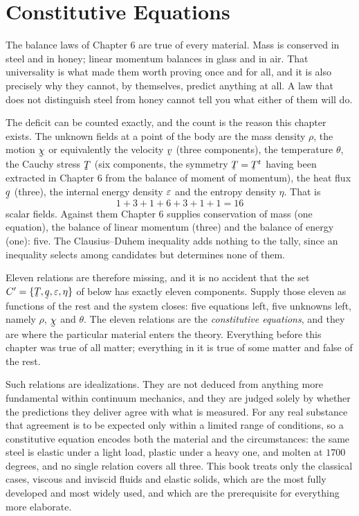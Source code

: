 \chapter{Constitutive Equations}

The balance laws of Chapter 6 are true of every material. Mass is
conserved in steel and in honey; linear momentum balances in glass and
in air. That universality is what made them worth proving once and for
all, and it is also precisely why they cannot, by themselves, predict
anything at all. A law that does not distinguish steel from honey
cannot tell you what either of them will do.

The deficit can be counted exactly, and the count is the reason this
chapter exists. The unknown fields at a point of the body are the mass
density $\rho$, the motion $\bchi$ or equivalently the velocity $\bv$
(three components), the temperature $\theta$, the Cauchy stress $\bT$
(six components, the symmetry $\bT=\bT^{t}$ having been extracted in
Chapter 6 from the balance of moment of momentum), the heat flux $\bq$
(three), the internal energy density $\varepsilon$ and the entropy density
$\eta$. That is
\[
   1+3+1+6+3+1+1=16
\]
scalar fields. Against them Chapter 6 supplies conservation of mass
(one equation), the balance of linear momentum (three) and the balance
of energy (one): five. The Clausius--Duhem inequality  adds
nothing to the tally, since an inequality selects among candidates but
determines none of them.

Eleven relations are therefore missing, and it is no accident that the
set $C'=\{\bT,\bq,\eps,\eta\}$ of  below has exactly eleven
components. Supply those eleven as functions of the rest and the system
closes: five equations left, five unknowns left, namely $\rho$, $\bchi$
and $\theta$. The eleven relations are the \emph{constitutive
equations}, and they are where the particular material enters the
theory. Everything before this chapter was true of all matter;
everything in it is true of some matter and false of the rest.

Such relations are idealizations. They are not deduced from anything
more fundamental within continuum mechanics, and they are judged solely
by whether the predictions they deliver agree with what is measured. For
any real substance that agreement is to be expected only within a
limited range of conditions, so a constitutive equation encodes both the
material and the circumstances: the same steel is elastic under a light
load, plastic under a heavy one, and molten at $1700$ degrees, and no
single relation covers all three. This book treats only the classical
cases, viscous and inviscid fluids and elastic solids, which are the
most fully developed and most widely used, and which are the
prerequisite for everything more elaborate.


